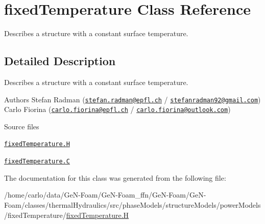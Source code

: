 \hypertarget{classFoam_1_1structures_1_1fixedTemperature}{}\section{fixed\+Temperature Class Reference}
\label{classFoam_1_1structures_1_1fixedTemperature}


Describes a structure with a constant surface temperature.  




\subsection{Detailed Description}
Describes a structure with a constant surface temperature. 

\label{_Description}%
 Authors Stefan Radman (\href{mailto:stefan.radman@epfl.ch}{\tt stefan.\+radman@epfl.\+ch} / \href{mailto:stefanradman92@gmail.com}{\tt stefanradman92@gmail.\+com}) Carlo Fiorina (\href{mailto:carlo.fiorina@epfl.ch}{\tt carlo.\+fiorina@epfl.\+ch} / \href{mailto:carlo.fiorina@outlook.com}{\tt carlo.\+fiorina@outlook.\+com})

\begin{DoxyParagraph}{Source files}

\begin{DoxyItemize}
\item \href{../../../home/carlo/data/GeN-Foam/GeN-Foam_ffn/GeN-Foam/GeN-Foam/classes/thermalHydraulics/src/phaseModels/structureModels/powerModels/fixedTemperature/fixedTemperature.H}{\tt fixed\+Temperature.\+H} 
\item \href{../../../home/carlo/data/GeN-Foam/GeN-Foam_ffn/GeN-Foam/GeN-Foam/classes/thermalHydraulics/src/phaseModels/structureModels/powerModels/fixedTemperature/fixedTemperature.C}{\tt fixed\+Temperature.\+C} 
\end{DoxyItemize}
\end{DoxyParagraph}


The documentation for this class was generated from the following file\+:\begin{DoxyCompactItemize}
\item 
/home/carlo/data/\+Ge\+N-\/\+Foam/\+Ge\+N-\/\+Foam\+\_\+ffn/\+Ge\+N-\/\+Foam/\+Ge\+N-\/\+Foam/classes/thermal\+Hydraulics/src/phase\+Models/structure\+Models/power\+Models/fixed\+Temperature/\hyperlink{fixedTemperature_8H}{fixed\+Temperature.\+H}\end{DoxyCompactItemize}

